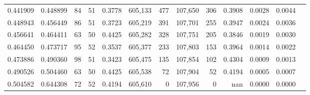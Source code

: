 \begin{tabular}{rrrrrrrrrrrrr}
0.441909 & 0.448899 &    84 &  51 &                                     0.3778 & 605,133 &     477 & 107,650 &     306 & 0.3908 & 0.0028 & 0.0044 \\
0.448943 & 0.456449 &    86 &  51 &                                     0.3723 & 605,219 &     391 & 107,701 &     255 & 0.3947 & 0.0024 & 0.0036 \\
0.456641 & 0.464411 &    63 &  50 &                                     0.4425 & 605,282 &     328 & 107,751 &     205 & 0.3846 & 0.0019 & 0.0030 \\
0.464450 & 0.473717 &    95 &  52 &                                     0.3537 & 605,377 &     233 & 107,803 &     153 & 0.3964 & 0.0014 & 0.0022 \\
0.473886 & 0.490360 &    98 &  51 &                                     0.3423 & 605,475 &     135 & 107,854 &     102 & 0.4304 & 0.0009 & 0.0013 \\
0.490526 & 0.504460 &    63 &  50 &                                     0.4425 & 605,538 &      72 & 107,904 &      52 & 0.4194 & 0.0005 & 0.0007 \\
0.504582 & 0.644308 &    72 &  52 &                                     0.4194 & 605,610 &       0 & 107,956 &       0 &    nan & 0.0000 & 0.0000 \\
\bottomrule
\end{tabular}
